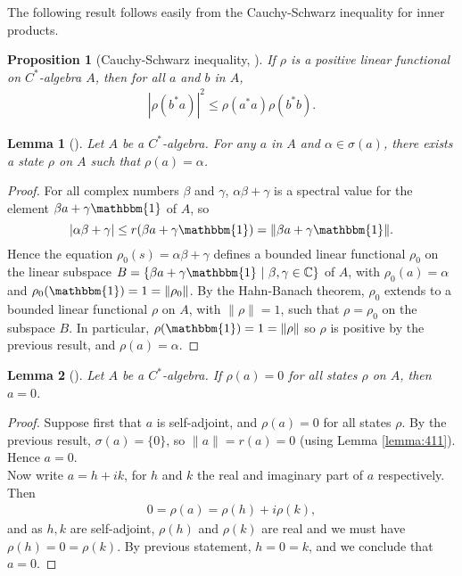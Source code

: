 \documentclass[12pt,a4paper]{report}
\theoremstyle{plain}
\newtheorem{lemma}{Lemma}
\newtheorem*{prop*}{Proposition}
\theoremstyle{definition}
\newcommand{\1}{\mathbbm{1}}
\newcommand{\C}{\mathbb{C}}
\newcommand{\spec}[1]{\sigma(#1)}
\begin{document}
The following result follows easily from the Cauchy-Schwarz inequality for inner products.
\begin{prop*}[Cauchy-Schwarz inequality, {\cite[4.3.1]{kadison83}}]
	If $\rho$ is a positive linear functional on $C^\ast$-algebra $A$, then for all $a$ and $b$ in $A$,
	\begin{align*}
		|\rho(b^\ast a)|^2 \leq \rho(a^\ast a)\rho(b^\ast b).
	\end{align*}
\end{prop*}


\begin{lemma}[{\cite[4.3.3]{kadison83}}]\label{lemma:433}
	Let $A$ be a $C^\ast$-algebra. For any $a$ in $A$ and $\alpha\in\spec{a}$, there exists a state
	$\rho$ on $A$ such that $\rho(a)=\alpha$.
\end{lemma}
\begin{proof}
	For all complex numbers $\beta$ and $\gamma$, $\alpha\beta+\gamma$ is a spectral value for the 
	element $\beta a+\gamma\1$ of $A$, so 
	\[
		|\alpha\beta+\gamma|\leq r(\beta a+\gamma\1)=\|\beta a+\gamma\1\|.
	\] 
	Hence the equation $\rho_0(s)=\alpha\beta+\gamma$ defines a bounded linear functional
	$\rho_0$ on the linear subspace $B= \{\beta a+\gamma\1 ~|~ \beta,\gamma\in\C\}$ of $A$, with 
	$\rho_0(a) =\alpha$ and $\rho_0(\1)=1=\|\rho_0\|$. By the Hahn-Banach theorem, 
	$\rho_0$ extends to a bounded linear functional $\rho$ on $A$, with $\|\rho\|=1$, such that 
	$\rho=\rho_0$ on the subspace $B$. In particular, $\rho(\1)=1=\|\rho\|$ so $\rho$ is positive by 
	the previous result, and $\rho(a)=\alpha$.
\end{proof}

\begin{lemma}[{\cite[4.3.4,(i)]{kadison83}}]\label{lemma:state1}
	Let $A$ be a $C^\ast$-algebra. If $\rho(a)=0$ for all states $\rho$ on $A$, then $a=0$.
\end{lemma}
\begin{proof}
	Suppose first that $a$ is self-adjoint, and $\rho(a)=0$ for all states $\rho$. By the previous
	result, $\spec{a}=\{0\}$, so $\|a\|=r(a)=0$ (using Lemma \ref{lemma:411}). Hence $a=0$.			\\
	Now write $a=h+ik$, for $h$ and $k$ the real and imaginary part of $a$ respectively. Then
	\begin{align*}
		0=\rho(a)=\rho(h)+i\rho(k),
	\end{align*}
	and as $h,k$ are self-adjoint, $\rho(h)$ and $\rho(k)$ are real and we must have 
	$\rho(h)=0=\rho(k)$. By previous statement, $h=0=k$, and we conclude that $a=0$.
\end{proof}
\end{document}
